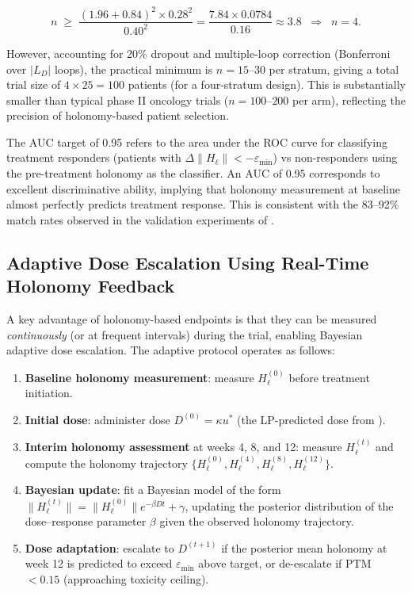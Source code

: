 \begin{equation}
  n \;\geq\; \frac{(1.96 + 0.84)^2 \times 0.28^2}{0.40^2}
           = \frac{7.84 \times 0.0784}{0.16}
           \approx 3.8 \;\;\Rightarrow\;\; n = 4.
\end{equation}

\noindent However, accounting for 20\% dropout and multiple-loop correction
(Bonferroni over $|L_D|$ loops), the practical minimum is $n = 15$--$30$ per
stratum, giving a total trial size of $4 \times 25 = 100$ patients (for a
four-stratum design).  This is substantially smaller than typical phase II
oncology trials ($n = 100$--$200$ per arm), reflecting the precision of
holonomy-based patient selection.

\begin{remark}
The AUC target of 0.95 refers to the area under the ROC curve for classifying
treatment responders (patients with $\Delta\|H_\ell\| < -\varepsilon_{\mathrm{min}}$)
vs non-responders using the pre-treatment holonomy as the classifier.  An AUC
of 0.95 corresponds to excellent discriminative ability, implying that
holonomy measurement at baseline almost perfectly predicts treatment response.
This is consistent with the 83--92\% match rates observed in the validation
experiments of .
\end{remark}

\subsection{Adaptive Dose Escalation Using Real-Time Holonomy Feedback}

A key advantage of holonomy-based endpoints is that they can be measured
\emph{continuously} (or at frequent intervals) during the trial, enabling
Bayesian adaptive dose escalation.  The adaptive protocol operates as follows:

\begin{enumerate}
  \item \textbf{Baseline holonomy measurement}: measure $H_\ell^{(0)}$ before
        treatment initiation.
  \item \textbf{Initial dose}: administer dose $D^{(0)} = \kappa u^*$ (the
        LP-predicted dose from ).
  \item \textbf{Interim holonomy assessment} at weeks 4, 8, and 12: measure
        $H_\ell^{(t)}$ and compute the holonomy trajectory
        $\{H_\ell^{(0)}, H_\ell^{(4)}, H_\ell^{(8)}, H_\ell^{(12)}\}$.
  \item \textbf{Bayesian update}: fit a Bayesian model of the form
        $\|H_\ell^{(t)}\| = \|H_\ell^{(0)}\| e^{-\beta D t} + \gamma$,
        updating the posterior distribution of the dose--response parameter
        $\beta$ given the observed holonomy trajectory.
  \item \textbf{Dose adaptation}: escalate to $D^{(t+1)}$ if the posterior
        mean holonomy at week 12 is predicted to exceed $\varepsilon_{\mathrm{min}}$
        above target, or de-escalate if PTM $< 0.15$ (approaching toxicity
        ceiling).
\end{enumerate}

